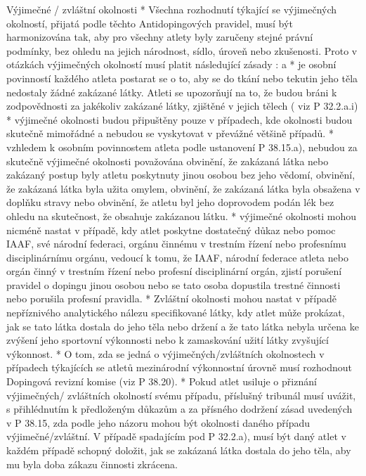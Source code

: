 Výjimečné / zvláštní okolnosti
* Všechna rozhodnutí týkající se výjimečných okolností, přijatá podle těchto Antidopingových pravidel, musí být harmonizována tak, aby pro všechny atlety byly zaručeny stejné právní podmínky, bez ohledu na jejich národnost, sídlo, úroveň nebo zkušenosti. Proto v otázkách výjimečných okolností musí platit následující zásady :
  \begitems \style a
  * je osobní povinností každého atleta postarat se o to, aby se do tkání nebo tekutin jeho těla nedostaly žádné zakázané látky. Atleti se upozorňují na to, že budou bráni k zodpovědnosti za jakékoliv zakázané látky, zjištěné v jejich tělech ( viz P 32.2.a.i)
  * výjimečné okolnosti budou připuštěny pouze v případech, kde okolnosti budou skutečně mimořádné a nebudou se vyskytovat v převážné většině případů.
  * vzhledem k osobním povinnostem atleta podle ustanovení P 38.15.a), nebudou za skutečně výjimečné okolnosti považována obvinění, že zakázaná látka nebo zakázaný postup byly atletu poskytnuty jinou osobou bez jeho vědomí, obvinění, že zakázaná látka byla užita omylem, obvinění, že zakázaná látka byla obsažena v doplňku stravy nebo obvinění, že atletu byl jeho doprovodem podán lék bez ohledu na skutečnost, že obsahuje zakázanou látku.
  * výjimečné okolnosti mohou nicméně nastat v případě, kdy atlet poskytne dostatečný důkaz nebo pomoc IAAF, své národní federaci, orgánu činnému v trestním řízení nebo profesnímu disciplinárnímu orgánu, vedoucí k tomu, že IAAF, národní federace atleta nebo orgán činný v trestním řízení nebo profesní disciplinární orgán, zjistí porušení pravidel o dopingu jinou osobou nebo se tato osoba dopustila trestné činnosti nebo porušila profesní pravidla.
  * Zvláštní okolnosti mohou nastat v případě nepříznivého analytického nálezu specifikované látky, kdy atlet může prokázat, jak se tato látka dostala do jeho těla nebo držení a že tato látka nebyla určena ke zvýšení jeho sportovní výkonnosti nebo k zamaskování užití látky zvyšující výkonnost.
  \enditems
* O tom, zda se jedná o výjimečných/zvláštních okolnostech v případech týkajících se atletů mezinárodní výkonnostní úrovně musí rozhodnout Dopingová revizní komise (viz P 38.20).
* Pokud atlet usiluje o přiznání výjimečných/ zvláštních okolností svému případu, příslušný tribunál musí uvážit, s přihlédnutím k předloženým důkazům a za přísného dodržení zásad uvedených v P 38.15, zda podle jeho názoru mohou být okolnosti daného případu výjimečné/zvláštní. V případě spadajícím pod P 32.2.a), musí být daný atlet v každém případě schopný doložit, jak se zakázaná látka dostala do jeho těla, aby mu byla doba zákazu činnosti zkrácena.
